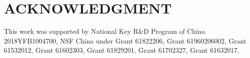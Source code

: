 \documentclass[letterpaper]{article} %
\begin{document}
\section{ACKNOWLEDGMENT}
This work was supported by National Key R\&D Program of China 2018YFB1004700, NSF China under Grant 61822206, Grant 61960206002, Grant 61532012, Grant 61602303, Grant 61829201, Grant 61702327, Grant 61632017.



\end{document}
